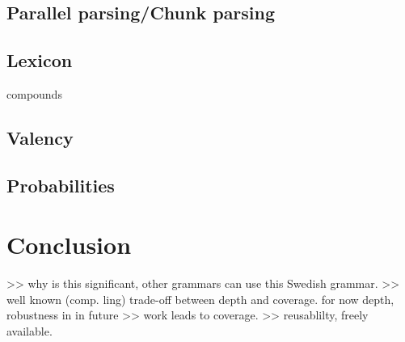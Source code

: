 \documentclass{report}
\begin{document}
\subsection{Parallel parsing/Chunk parsing}
\subsection{Lexicon}
compounds


\subsection{Valency}
\label{sec:futureValency}

\subsection{Probabilities}
\label{sec:futureProbabilities}


\section{Conclusion}
>> why is this significant, other grammars can use this Swedish grammar.
>> well known (comp. ling) trade-off between depth and coverage. for now depth, robustness in in future
>> work leads to coverage.
>> reusablilty, freely available.




\end{document}
